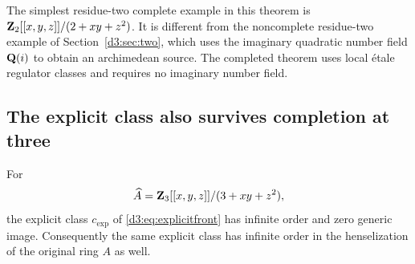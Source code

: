 \begin{remark}
The simplest residue-two complete example in this theorem is $\mathbf Z_2[[x,y,z]]/(2+xy+z^2)$. It is different from the noncomplete residue-two example of Section~\ref{d3:sec:two}, which uses the imaginary quadratic number field $\mathbf Q(i)$ to obtain an archimedean source. The completed theorem uses local \'etale regulator classes and requires no imaginary number field.
\end{remark}

\subsection{The explicit class also survives completion at three}\label{d3:sec:explicitcomplete}

\begin{proposition}\label{d3:prop:explicitcomplete}
For
\[
\widehat A=\mathbf Z_3[[x,y,z]]/(3+xy+z^2),
\]
the explicit class $c_{\mathrm{exp}}$ of \eqref{d3:eq:explicitfront} has infinite order and zero generic image. Consequently the same explicit class has infinite order in the henselization of the original ring $A$ as well.
\end{proposition}
